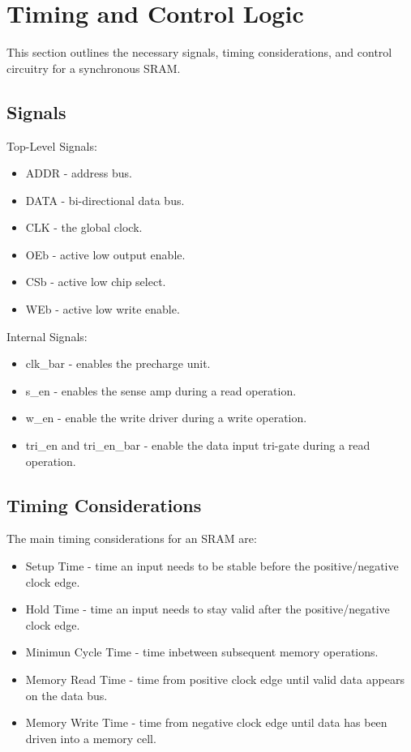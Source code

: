 \section{Timing and Control Logic}
\label{timing}

This section outlines the necessary signals, timing considerations, and control circuitry for a synchronous SRAM.

\subsection{Signals}
\label{signals}
Top-Level Signals:
\begin{itemize}
\setlength{\itemsep}{0pt}
\item ADDR - address bus.
\item DATA - bi-directional data bus.
\item CLK - the global clock.
\item OEb - active low output enable.
\item CSb - active low chip select.
\item WEb - active low write enable.
\end{itemize}

Internal Signals:
\begin{itemize}
\setlength{\itemsep}{0pt}
\item clk\_bar - enables the precharge unit.
\item s\_en - enables the sense amp during a read operation.
\item w\_en - enable the write driver during a write operation.
\item tri\_en and tri\_en\_bar - enable the data input tri-gate during a read operation.
\end{itemize}

\subsection{Timing Considerations}
\label{timing_params}

The main timing considerations for an SRAM are:
\begin{itemize}
\setlength{\itemsep}{0pt}
\item Setup Time - time an input needs to be stable before the positive/negative clock edge.
\item Hold Time - time an input needs to stay valid after the positive/negative clock edge.  
\item Minimun Cycle Time - time inbetween subsequent memory operations.
\item Memory Read Time - time from positive clock edge until valid data appears on the data bus.
\item Memory Write Time - time from negative clock edge until data has been driven into a memory cell.
\end{itemize}

